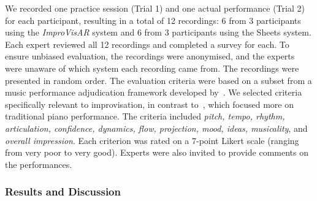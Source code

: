 \documentclass{vgtc}                          %
\begin{document}
\par %
We recorded one practice session (Trial 1) and one actual performance (Trial 2) for each participant, resulting in a total of 12 recordings: 6 from 3 participants using the \textit{ImproVisAR} system and 6 from 3 participants using the Sheets system. Each expert reviewed all 12 recordings and completed a survey for each. To ensure unbiased evaluation, the recordings were anonymised, and the experts were unaware of which system each recording came from. The recordings were presented in random order. %
The evaluation criteria were based on a subset from a music performance adjudication framework developed by~\cite{wrigley2013ecological}. We selected criteria specifically relevant to improvisation, in contrast to~\cite{rogers2014piano}, which focused more on traditional piano performance. The criteria included \textit{pitch, tempo, rhythm, articulation, confidence, dynamics, flow, projection, mood, ideas, musicality}, and \textit{overall impression}. Each criterion was rated on a 7-point Likert scale (ranging from very poor to very good). Experts were also invited to provide comments on the performances.

\subsubsection{Results and Discussion}
\end{document}

